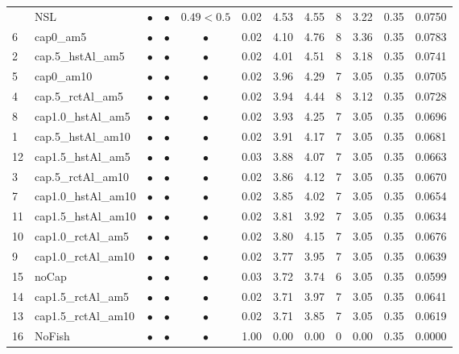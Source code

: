 \documentclass[11pt]{book}
\begin{document}
\begin{landscape}
\begin{longtable}[t]{llcccccccccc}
\midrule
\endhead
\
\endfoot
\bottomrule
\endlastfoot
17 & NSL & $\bullet$ & $\bullet$ & $0.49<0.5$ & 0.02 & 4.53 & 4.55 & 8 & 3.22 & 0.35 & 0.0750\\
6 & cap0\_am5 & $\bullet$ & $\bullet$ & $\bullet$ & 0.02 & 4.10 & 4.76 & 8 & 3.36 & 0.35 & 0.0783\\
2 & cap.5\_hstAl\_am5 & $\bullet$ & $\bullet$ & $\bullet$ & 0.02 & 4.01 & 4.51 & 8 & 3.18 & 0.35 & 0.0741\\
5 & cap0\_am10 & $\bullet$ & $\bullet$ & $\bullet$ & 0.02 & 3.96 & 4.29 & 7 & 3.05 & 0.35 & 0.0705\\
4 & cap.5\_rctAl\_am5 & $\bullet$ & $\bullet$ & $\bullet$ & 0.02 & 3.94 & 4.44 & 8 & 3.12 & 0.35 & 0.0728\\
8 & cap1.0\_hstAl\_am5 & $\bullet$ & $\bullet$ & $\bullet$ & 0.02 & 3.93 & 4.25 & 7 & 3.05 & 0.35 & 0.0696\\
1 & cap.5\_hstAl\_am10 & $\bullet$ & $\bullet$ & $\bullet$ & 0.02 & 3.91 & 4.17 & 7 & 3.05 & 0.35 & 0.0681\\
12 & cap1.5\_hstAl\_am5 & $\bullet$ & $\bullet$ & $\bullet$ & 0.03 & 3.88 & 4.07 & 7 & 3.05 & 0.35 & 0.0663\\
3 & cap.5\_rctAl\_am10 & $\bullet$ & $\bullet$ & $\bullet$ & 0.02 & 3.86 & 4.12 & 7 & 3.05 & 0.35 & 0.0670\\
7 & cap1.0\_hstAl\_am10 & $\bullet$ & $\bullet$ & $\bullet$ & 0.02 & 3.85 & 4.02 & 7 & 3.05 & 0.35 & 0.0654\\
11 & cap1.5\_hstAl\_am10 & $\bullet$ & $\bullet$ & $\bullet$ & 0.02 & 3.81 & 3.92 & 7 & 3.05 & 0.35 & 0.0634\\
10 & cap1.0\_rctAl\_am5 & $\bullet$ & $\bullet$ & $\bullet$ & 0.02 & 3.80 & 4.15 & 7 & 3.05 & 0.35 & 0.0676\\
9 & cap1.0\_rctAl\_am10 & $\bullet$ & $\bullet$ & $\bullet$ & 0.02 & 3.77 & 3.95 & 7 & 3.05 & 0.35 & 0.0639\\
15 & noCap & $\bullet$ & $\bullet$ & $\bullet$ & 0.03 & 3.72 & 3.74 & 6 & 3.05 & 0.35 & 0.0599\\
14 & cap1.5\_rctAl\_am5 & $\bullet$ & $\bullet$ & $\bullet$ & 0.02 & 3.71 & 3.97 & 7 & 3.05 & 0.35 & 0.0641\\
13 & cap1.5\_rctAl\_am10 & $\bullet$ & $\bullet$ & $\bullet$ & 0.02 & 3.71 & 3.85 & 7 & 3.05 & 0.35 & 0.0619\\
16 & NoFish & $\bullet$ & $\bullet$ & $\bullet$ & 1.00 & 0.00 & 0.00 & 0 & 0.00 & 0.35 & 0.0000\\*
\end{longtable}
\endgroup{}
\end{landscape}
\endgroup{}
\end{document}
